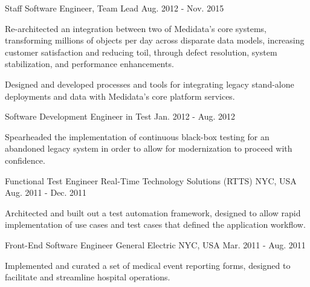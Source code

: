 \begin{cventries}
  \cventry
    {Staff Software Engineer, Team Lead}
    {}
    {}
    {Aug. 2012 - Nov. 2015}
    {
        \begin{cvitems}
          \item {
            Re-architected an integration between two of Medidata's core systems, transforming millions of objects per
            day across disparate data models, increasing customer satisfaction and reducing toil, through defect
            resolution, system stabilization, and performance enhancements.
          }
          \item {
            Designed and developed processes and tools for integrating legacy stand-alone deployments and data with
            Medidata's core platform services.
          }
        \end{cvitems}
    }
    
  \cventry
    {Software Development Engineer in Test}
    {}
    {}
    {Jan. 2012 - Aug. 2012}
    {
        \begin{cvitems}
          \item {
            Spearheaded the implementation of continuous black-box testing for an abandoned legacy system in order to
            allow for modernization to proceed with confidence.
          }
        \end{cvitems}
    }
    
  \cventry
    {Functional Test Engineer} %
    {Real-Time Technology Solutions (RTTS)} %
    {NYC, USA} %
    {Aug. 2011 - Dec. 2011} %
    {
      \begin{cvitems} %
        \item {
          Architected and built out a test automation framework, designed to allow rapid implementation of use cases
          and test cases that defined the application workflow.
        }
      \end{cvitems}
    }

  \cventry
    {Front-End Software Engineer} %
    {General Electric} %
    {NYC, USA} %
    {Mar. 2011 - Aug. 2011} %
    {
      \begin{cvitems} %
        \item {
          Implemented and curated a set of medical event reporting forms, designed to facilitate and streamline
          hospital operations.
        }
      \end{cvitems}
    }

\end{cventries}
